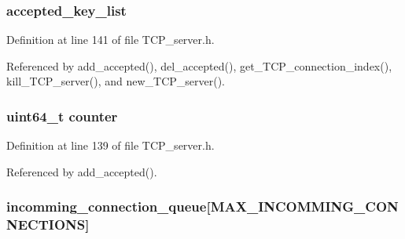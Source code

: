 \hypertarget{struct_t_c_p___server_ae01209a4897757539a5ff199cdcfb64c}{
\subsubsection[{accepted\+\_\+key\+\_\+list}]{ accepted\+\_\+key\+\_\+list}}\label{struct_t_c_p___server_ae01209a4897757539a5ff199cdcfb64c}


Definition at line 141 of file T\+C\+P\+\_\+server.\+h.



Referenced by add\+\_\+accepted(), del\+\_\+accepted(), get\+\_\+\+T\+C\+P\+\_\+connection\+\_\+index(), kill\+\_\+\+T\+C\+P\+\_\+server(), and new\+\_\+\+T\+C\+P\+\_\+server().

\hypertarget{struct_t_c_p___server_a1944753ac8107ec537f75b7e0201d866}{
\subsubsection[{counter}]{\setlength{\rightskip}{0pt plus 5cm}uint64\+\_\+t counter}}\label{struct_t_c_p___server_a1944753ac8107ec537f75b7e0201d866}


Definition at line 139 of file T\+C\+P\+\_\+server.\+h.



Referenced by add\+\_\+accepted().

\hypertarget{struct_t_c_p___server_aee7190e93d63765a9a2642895d6ec8b0}{
\subsubsection[{incomming\+\_\+connection\+\_\+queue}]{ incomming\+\_\+connection\+\_\+queue\mbox{[}{\bf M\+A\+X\+\_\+\+I\+N\+C\+O\+M\+M\+I\+N\+G\+\_\+\+C\+O\+N\+N\+E\+C\+T\+I\+O\+N\+S}\mbox{]}}}\label{struct_t_c_p___server_aee7190e93d63765a9a2642895d6ec8b0}


